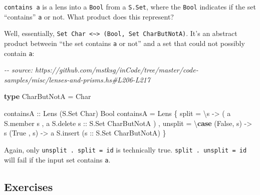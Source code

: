\documentclass[]{article}
\newenvironment{Shaded}{}{}
\newcommand{\CharTok}[1]{\textcolor[rgb]{0.25,0.44,0.63}{#1}}
\newcommand{\CommentTok}[1]{\textcolor[rgb]{0.38,0.63,0.69}{\textit{#1}}}
\newcommand{\DataTypeTok}[1]{\textcolor[rgb]{0.56,0.13,0.00}{#1}}
\newcommand{\KeywordTok}[1]{\textcolor[rgb]{0.00,0.44,0.13}{\textbf{#1}}}
\newcommand{\NormalTok}[1]{#1}
\newcommand{\OtherTok}[1]{\textcolor[rgb]{0.00,0.44,0.13}{#1}}
\begin{document}
\texttt{contains\ \textquotesingle{}a\textquotesingle{}} is a lens into a
\texttt{Bool} from a \texttt{S.Set}, where the \texttt{Bool} indicates if the
set ``contains'' \texttt{a} or not. What product does this represent?

Well, essentially,
\texttt{Set\ Char\ \textless{}\textasciitilde{}\textgreater{}\ (Bool,\ Set\ CharButNotA)}.
It's an abstract product betweein ``the set contains
\texttt{\textquotesingle{}a\textquotesingle{}} or not'' and a set that could not
possibly contain \texttt{\textquotesingle{}a\textquotesingle{}}:

\begin{Shaded}
\begin{Highlighting}[]
\CommentTok{{-}{-} source: https://github.com/mstksg/inCode/tree/master/code{-}samples/misc/lenses{-}and{-}prisms.hs\#L206{-}L217}

\KeywordTok{type} \DataTypeTok{CharButNotA} \OtherTok{=} \DataTypeTok{Char}

\OtherTok{containsA ::} \DataTypeTok{Lens\textquotesingle{}}\NormalTok{ (}\DataTypeTok{S.Set} \DataTypeTok{Char}\NormalTok{) }\DataTypeTok{Bool}
\NormalTok{containsA }\OtherTok{=} \DataTypeTok{Lens\textquotesingle{}}
\NormalTok{    \{ split   }\OtherTok{=}\NormalTok{ \textbackslash{}s }\OtherTok{{-}>}
\NormalTok{        ( }\CharTok{\textquotesingle{}a\textquotesingle{}} \OtherTok{\textasciigrave{}S.member\textasciigrave{}}\NormalTok{ s}
\NormalTok{        , }\CharTok{\textquotesingle{}a\textquotesingle{}} \OtherTok{\textasciigrave{}S.delete\textasciigrave{} s      ::} \DataTypeTok{S.Set} \DataTypeTok{CharButNotA}
\NormalTok{        )}
\NormalTok{    , unsplit }\OtherTok{=}\NormalTok{ \textbackslash{}}\KeywordTok{case}
\NormalTok{        (}\DataTypeTok{False}\NormalTok{, s) }\OtherTok{{-}>}\NormalTok{ s}
\NormalTok{        (}\DataTypeTok{True}\NormalTok{ , s) }\OtherTok{{-}>} \CharTok{\textquotesingle{}a\textquotesingle{}} \OtherTok{\textasciigrave{}S.insert\textasciigrave{}}\NormalTok{ (}\OtherTok{s ::} \DataTypeTok{S.Set} \DataTypeTok{CharButNotA}\NormalTok{)}
\NormalTok{    \}}
\end{Highlighting}
\end{Shaded}

Again, only \texttt{unsplit\ .\ split\ =\ id} is technically true.
\texttt{split\ .\ unsplit\ =\ id} will fail if the input set contains
\texttt{\textquotesingle{}a\textquotesingle{}}.

\hypertarget{exercises}{%
\subsection{Exercises}\label{exercises}}
\end{document}
